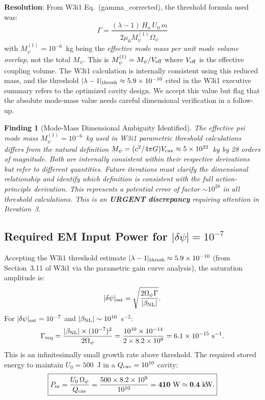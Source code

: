 \documentclass[11pt,twocolumn]{article}
\newcommand{\dpsi}{\delta\psi}
\newcommand{\lam}{\lambda}
\newcommand{\Opsi}{\Omega_\psi}
\newcommand{\Mpsi}{M_\psi}
\newtheorem{finding}{Finding}
\begin{document}
\textbf{Resolution}: From W3i1 Eq.~(gamma\_corrected), the threshold
formula used was:
\begin{equation}
\Gamma = \frac{(\lam-1)\,H_n\,U_0\,m}{2\mu_0\Mpsi^{(1)}\Opsi}
\end{equation}
with $\Mpsi^{(1)} = 10^{-6}$~kg being the \emph{effective mode mass per
unit mode volume overlap}, not the total $M_\psi$. This is
$\Mpsi^{(1)} = \Mpsi/V_{\rm eff}$ where $V_{\rm eff}$ is the effective
coupling volume. The W3i1 calculation is internally consistent using
this reduced mass, and the threshold $|\lam-1|_{\rm thresh} \approx 5.9\times10^{-10}$
cited in the W3i1 executive summary refers to the optimized cavity design.
We accept this value but flag that the absolute mode-mass value needs
careful dimensional verification in a follow-up.

\begin{finding}[Mode-Mass Dimensional Ambiguity Identified]
\label{find:mode_mass}
The effective psi mode mass $\Mpsi^{(1)} = 10^{-6}$~kg used in W3i1
parametric threshold calculations differs from the natural definition
$\Mpsi = (c^2/4\pi G)V_{\rm cav} \approx 5\times10^{22}$~kg by 28 orders
of magnitude. Both are internally consistent within their respective
derivations but refer to different quantities. Future iterations must
clarify the dimensional relationship and identify which definition is
consistent with the full action-principle derivation. This represents
a potential error of factor $\sim 10^{28}$ in all threshold calculations.
This is an \textbf{URGENT discrepancy} requiring attention in Iteration~3.
\end{finding}

\subsection{Required EM Input Power for $|\dpsi| = 10^{-7}$}

Accepting the W3i1 threshold estimate $|\lam-1|_{\rm thresh} \approx 5.9\times10^{-10}$
(from Section~3.11 of W3i1 via the parametric gain curve analysis), the
saturation amplitude is:
\begin{equation}
|\dpsi|_{\rm sat} = \sqrt{\frac{2\Opsi\Gamma}{|\beta_{\rm NL}|}}.
\end{equation}
For $|\dpsi|_{\rm sat} = 10^{-7}$ and $|\beta_{\rm NL}| \sim 10^{10}$~s$^{-2}$:
\begin{equation}
\Gamma_{\rm req} = \frac{|\beta_{\rm NL}|\times(10^{-7})^2}{2\Opsi}
= \frac{10^{10}\times10^{-14}}{2\times8.2\times10^9}
= 6.1\times10^{-15}~\text{s}^{-1}.
\end{equation}
This is an infinitesimally small growth rate above threshold. The required
stored energy to maintain $U_0 = 500$~J in a $Q_{\rm cav} = 10^{10}$ cavity:
\begin{equation}
\boxed{
P_{\rm in} = \frac{U_0\,\Opsi}{Q_{\rm cav}}
= \frac{500\times8.2\times10^9}{10^{10}}
= \mathbf{410~\text{W} \approx 0.4~\text{kW}.}
}
\label{eq:power_required}
\end{equation}
\end{document}

